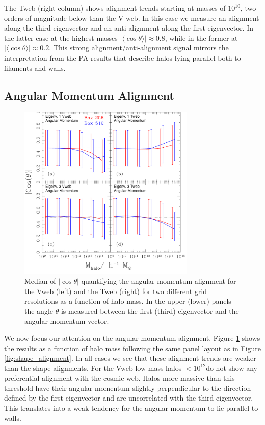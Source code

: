 \documentclass[useAMS,usenatbib]{mn2e}
\newcommand{\hMsun}{{\ifmmode{h^{-1}{\rm
        {M_{\odot}}}}\else{$h^{-1}{\rm{M_{\odot}}}$~}\fi}}
\newcommand{\muavg}{\vert\langle\cos\theta\rangle\vert}
\begin{document}
The Tweb (right column) shows alignment trends starting at masses of
$10^{10}$\hMsun, two orders of magnitude below than the V-web. In this
case we measure an alignment along the third eigenvector and an
anti-alignment along the first eigenvector. In the latter case at the
highest masses $\muavg\approx 0.8$, while in the former at $\muavg\approx
0.2$. This strong alignment/anti-alignment signal mirrors the
interpretation from the PA results that describe halos lying parallel
both to filaments and walls.


\subsection{Angular Momentum Alignment}

\begin{figure}
\includegraphics[width=0.75\textwidth]{Fig3.pdf}
\caption{Median of $|\cos\theta|$ quantifying the angular momentum
  alignment for the Vweb (left) and the Tweb (right) for two different
  grid resolutions as a function of halo mass. In the upper (lower)
  panels the angle $\theta$ is measured between the first (third)
  eigenvector and the angular momentum
  vector.\label{fig:spin_alignment}} 
\end{figure}


We now focus our attention on the angular momentum alignment. Figure
\ref{fig:spin_alignment} shows the results as a function of halo mass
following the same panel layout as in Figure
\ref{fig:shape_alignment}. In all cases we see that these alignment
trends are weaker than the shape alignments. For the Vweb low mass halos
$<10^{12}$\hMsun do not show any preferential alignment with the
cosmic web. Halos more massive than this threshold have their angular
momentum slightly perpendicular to the direction defined by the first
eigenvector and are uncorrelated with the third eigenvector. This translates
into a weak tendency for the angular momentum to lie parallel to walls.
\end{document}
